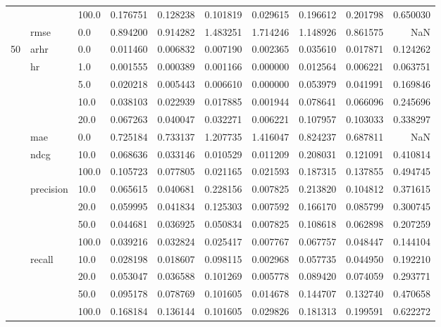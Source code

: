 \begin{tabular}{lllrrrrrrr}
    &      & 100.0 &  0.176751 &  0.128238 &  0.101819 &  0.029615 &  0.196612 &  0.201798 &  0.650030 \\
    & rmse & 0.0   &  0.894200 &  0.914282 &  1.483251 &  1.714246 &  1.148926 &  0.861575 &       NaN \\
50  & arhr & 0.0   &  0.011460 &  0.006832 &  0.007190 &  0.002365 &  0.035610 &  0.017871 &  0.124262 \\
    & hr & 1.0   &  0.001555 &  0.000389 &  0.001166 &  0.000000 &  0.012564 &  0.006221 &  0.063751 \\
    &      & 5.0   &  0.020218 &  0.005443 &  0.006610 &  0.000000 &  0.053979 &  0.041991 &  0.169846 \\
    &      & 10.0  &  0.038103 &  0.022939 &  0.017885 &  0.001944 &  0.078641 &  0.066096 &  0.245696 \\
    &      & 20.0  &  0.067263 &  0.040047 &  0.032271 &  0.006221 &  0.107957 &  0.103033 &  0.338297 \\
    & mae & 0.0   &  0.725184 &  0.733137 &  1.207735 &  1.416047 &  0.824237 &  0.687811 &       NaN \\
    & ndcg & 10.0  &  0.068636 &  0.033146 &  0.010529 &  0.011209 &  0.208031 &  0.121091 &  0.410814 \\
    &      & 100.0 &  0.105723 &  0.077805 &  0.021165 &  0.021593 &  0.187315 &  0.137855 &  0.494745 \\
    & precision & 10.0  &  0.065615 &  0.040681 &  0.228156 &  0.007825 &  0.213820 &  0.104812 &  0.371615 \\
    &      & 20.0  &  0.059995 &  0.041834 &  0.125303 &  0.007592 &  0.166170 &  0.085799 &  0.300745 \\
    &      & 50.0  &  0.044681 &  0.036925 &  0.050834 &  0.007825 &  0.108618 &  0.062898 &  0.207259 \\
    &      & 100.0 &  0.039216 &  0.032824 &  0.025417 &  0.007767 &  0.067757 &  0.048447 &  0.144104 \\
    & recall & 10.0  &  0.028198 &  0.018607 &  0.098115 &  0.002968 &  0.057735 &  0.044950 &  0.192210 \\
    &      & 20.0  &  0.053047 &  0.036588 &  0.101269 &  0.005778 &  0.089420 &  0.074059 &  0.293771 \\
    &      & 50.0  &  0.095178 &  0.078769 &  0.101605 &  0.014678 &  0.144707 &  0.132740 &  0.470658 \\
    &      & 100.0 &  0.168184 &  0.136144 &  0.101605 &  0.029826 &  0.181313 &  0.199591 &  0.622272 \\

\end{tabular}
